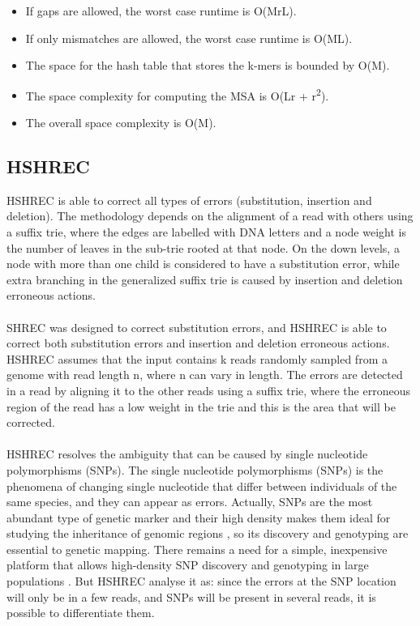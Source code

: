 \documentclass[12pt,openany]{llncs}
\begin{document}
\begin{itemize}
	\item If gaps are allowed, the worst case runtime is O(MrL).
	\item If only mismatches are allowed, the worst case runtime is O(ML).
	\item The space for the hash table that stores the k-mers is bounded by O(M).
	\item The space complexity for computing the MSA is O(Lr + r\textsuperscript{2}).
	\item The overall space complexity is O(M).
\end{itemize}

\subsection{HSHREC}
HSHREC \cite{HShrec} is able to correct all types of errors (substitution, insertion and deletion). The methodology depends on the alignment of a read with others using a suffix trie, where the edges are labelled with DNA letters and a node weight is the number of leaves in the sub-trie rooted at that node. On the down levels, a node with more than one child is considered to have a substitution error, while extra branching in the generalized suffix trie is caused by insertion and deletion erroneous actions.
\\
\\
SHREC was designed to correct substitution errors, and HSHREC is able to correct both substitution errors and insertion and deletion erroneous actions.
\\
HSHREC assumes that the input contains k reads randomly sampled from a genome with read length n, where n can vary in length. The errors are detected in a read by aligning it to the other reads using a suffix trie, where the erroneous region of the read has a low weight in the trie and this is the area that will be corrected.
\\
\\
HSHREC resolves the ambiguity that can be caused by single nucleotide polymorphisms (SNPs). The single nucleotide polymorphisms (SNPs) is the phenomena of changing single nucleotide that differ between individuals of the same species, and they can appear as errors. Actually, SNPs are the most abundant type of genetic marker and their high density makes them ideal for studying the inheritance of genomic regions \cite{SNP1,SNP2}, so its discovery and genotyping are essential to genetic mapping. There remains a need for a simple, inexpensive platform that allows high-density SNP discovery and genotyping in large populations \cite{SNP3}. But HSHREC analyse it as: since the errors at the SNP location will only be in a few reads, and SNPs will be present in several reads, it is possible to differentiate them.
\end{document}
